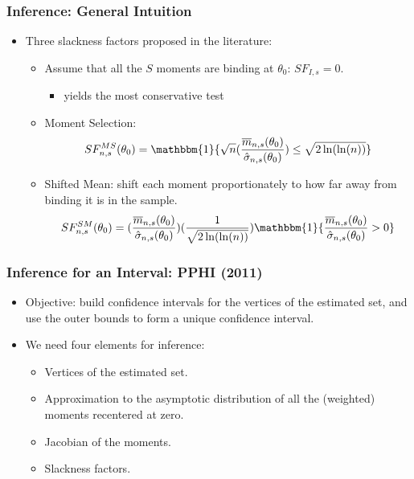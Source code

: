 \documentclass[10pt,letterpaper]{beamer}
\begin{document}
\begin{frame}
\frametitle{Inference: General Intuition}

\begin{itemize}
\item Three slackness factors proposed in the literature: 

\begin{itemize}
\item Assume that all the $S$ moments are binding at $\theta_{0}$: $%
SF_{I,s}=0$. 

\begin{itemize}
\item yields the most conservative test 
\end{itemize}

\item Moment Selection:  
\begin{equation*}
SF^{MS}_{n,s}(\theta_{0})=\mathbbm{1}\{\sqrt{n}(\frac{\overline{m}%
_{n,s}(\theta_{0})}{\hat{\sigma }_{n,s}(\theta_{0})})\leq\sqrt{2\ln (\ln (n))%
}\}
\end{equation*}

\item Shifted Mean: shift each moment proportionately to how far away from
binding it is in the sample.  
\begin{equation*}
SF^{SM}_{n,s}(\theta_{0})=(\frac{\overline{m}_{n,s}(\theta_{0})}{\hat{\sigma}%
_{n,s}(\theta_{0})})(\frac{1}{\sqrt{2\ln(\ln (n))}})\mathbbm{1}\{\frac{%
\overline{m}_{n,s}(\theta_{0})}{\hat{\sigma}_{n,s}(\theta_{0})}>0\}
\end{equation*}
\end{itemize}
\end{itemize}
\end{frame}


\begin{frame}
\frametitle{Inference for an Interval: PPHI (2011)}

\begin{itemize}
\item Objective: build confidence intervals for the vertices of the
estimated set, and use the outer bounds to form a unique confidence
interval. 

\item We need four elements for inference: 

\begin{itemize}
\item Vertices of the estimated set. 

\item Approximation to the asymptotic distribution of all the (weighted)
moments recentered at zero. 

\item Jacobian of the moments. 

\item Slackness factors. 
\end{itemize}
\end{itemize}

\end{frame}
\end{document}
